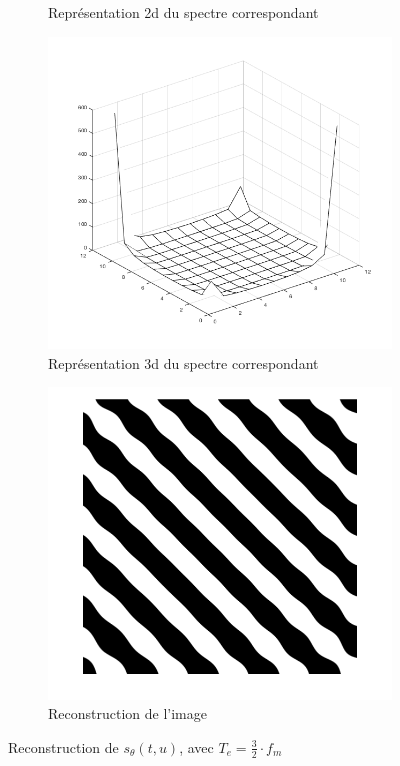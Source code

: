 \documentclass[a4paper]{article}
\begin{document}
\begin{figure}[H]
\begin{subfigure}[c]{0.46\textwidth}
        \caption{Représentation 2d du spectre correspondant}
    \label{subimg:ft-3demi-2D}
    \end{subfigure}
    \begin{subfigure}[c]{0.46\textwidth}
        \centering
        \includegraphics[width=\textwidth]{images/ft43D.png}
        \caption{Représentation 3d du spectre correspondant}
    \label{subimg:ft-3demi-3D}
    \end{subfigure}
    \begin{subfigure}[c]{0.46\textwidth}
        \centering
        \includegraphics[width=\textwidth]{images/sin-r4.png}
        \caption{Reconstruction de l'image}
    \label{subimg:sin-3demi-r}
    \end{subfigure}
    \label{img:sin-reconstr-3demi}
    \caption{Reconstruction de $s_{\theta}(t,u)$, avec $T_e = \frac{3}{2} \cdot
    f_m$}
\end{figure}
\end{document}
